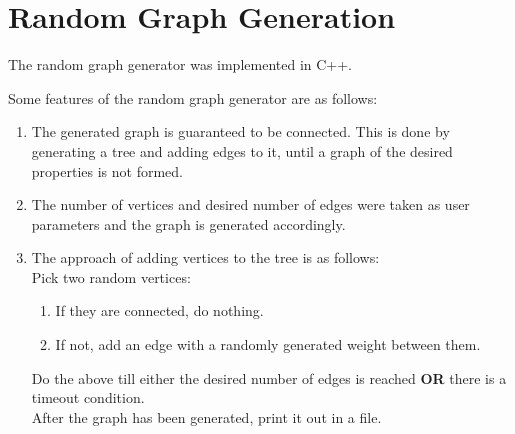 \documentclass[]{article}
\begin{document}
\section{Random Graph Generation}
\begin{flushleft}
	The random graph generator was implemented in C++.
	
	Some features of the random graph generator are as follows:
	
\begin{enumerate}
	\item The generated graph is guaranteed to be connected. This is done by generating a tree and adding edges to it, until a graph of the desired properties is not formed.

	\item The number of vertices and desired number of edges were taken as user parameters and the graph is generated accordingly.
	
	\item The approach of adding vertices to the tree is as follows:\\
	\vspace{10px}
Pick two random vertices:	
	\begin{enumerate}
	\item If they are connected, do nothing.
	\item If not, add an edge with a randomly generated weight between them.
	\end{enumerate}
Do the above till either the desired number of edges is reached \textbf{OR} there is a timeout condition.	\\
	After the graph has been generated, print it out in a file.
\end{enumerate}

\end{flushleft}
\end{document}
